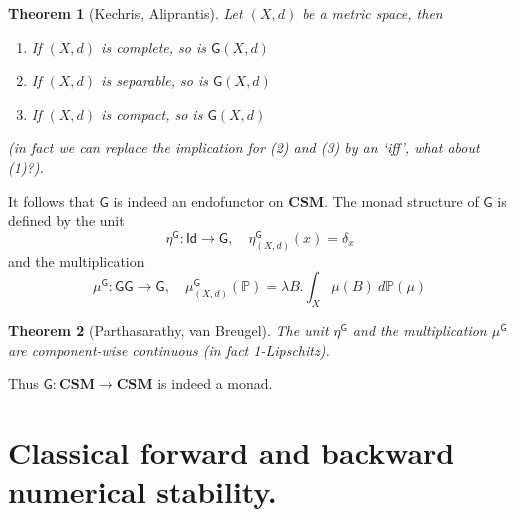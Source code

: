 \documentclass[10pt,a4paper]{article}
\theoremstyle{plain}
\newtheorem{theorem}{Theorem}
\theoremstyle{definition}
\newcommand{\CSM}{\mathbf{CSM}}
\newcommand{\Giry}{\mathsf{G}}
\newcommand{\Id}{\mathsf{Id}}
\begin{document}
\begin{theorem}[Kechris, Aliprantis]
Let $(X,d)$ be a metric space, then
\begin{enumerate}
\item If $(X,d)$ is complete, so is $\Giry(X,d)$
\item If $(X,d)$ is separable, so is $\Giry(X,d)$
\item If $(X,d)$ is compact, so is $\Giry(X,d)$
\end{enumerate}
(in fact we can replace the implication for (2) and (3) by an `iff', what about (1)?).
\end{theorem}

It follows that $\Giry$ is indeed an endofunctor on $\CSM$. The monad structure of $\Giry$ is defined by the unit
\[
\eta^{\Giry}: \Id\to\Giry,\quad\eta^{\Giry}_{(X,d)}(x)=\delta_x
\]
and the multiplication
\[
\mu^{\Giry}:\Giry\Giry\to\Giry,\quad\mu^{\Giry}_{(X,d)}(\mathbb{P})=\lambda B.\int_X \mu(B)~d\mathbb{P}(\mu)
\]
\begin{theorem}[Parthasarathy, van Breugel]
The unit $\eta^{\Giry}$ and the multiplication $\mu^{\Giry}$ are component-wise continuous (in fact 1-Lipschitz).
\end{theorem}
Thus $\Giry:\CSM\to\CSM$ is indeed a monad.

\section{Classical forward and backward numerical stability.}
\end{document}
